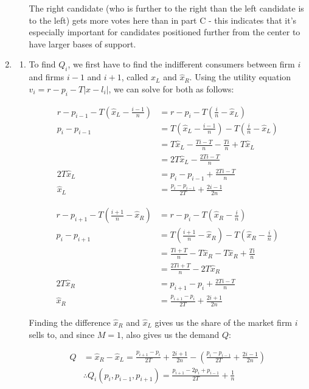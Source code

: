 \documentclass[12pt,letterpaper]{article}
\begin{document}
\begin{enumerate}
\begin{enumerate}
	The right candidate (who is further to the right than the left candidate is to the left) gets more votes here than in part C - this indicates that it's especially important for candidates positioned further from the center to have larger bases of support. 
\end{enumerate}

\item 

\begin{enumerate}
	\item To find $Q_i$, we first have to find the indifferent consumers between firm $i$ and firms $i-1$ and $i+1$, called $\hat{x}_L$ and $\hat{x}_R$. Using the utility equation $v_i = r - p_i - T | x - l_i |$, we can solve for both as follows:

\begin{align*}
	r - p_{i-1} - T(\hat{x}_L - \frac{i-1}{n}) &= r - p_i - T(\frac{i}{n} - \hat{x}_L) \\
	p_i - p_{i-1} &= T(\hat{x}_L - \frac{i-1}{n}) - T(\frac{i}{n} - \hat{x}_L) \\ 
	&= T\hat{x}_L - \frac{Ti-T}{n} - \frac{Ti}{n} + T\hat{x}_L \\
	&= 2T\hat{x}_L - \frac{2Ti - T}{n} \\
	2T\hat{x}_L &= p_i - p_{i-1} +  \frac{2Ti - T}{n} \\
	\hat{x}_L &= \frac{p_i - p_{i-1}}{2T} + \frac{2i - 1}{2n}
\end{align*}

\begin{align*}
	r - p_{i+1} - T(\frac{i+1}{n} - \hat{x}_R) &= r - p_i - T(\hat{x}_R - \frac{i}{n}) \\
	p_i - p_{i+1} &= T(\frac{i+1}{n} - \hat{x}_R) - T(\hat{x}_R - \frac{i}{n}) \\ 
	&= \frac{Ti+T}{n} - T\hat{x}_R - T\hat{x}_R + \frac{Ti}{n} \\
	&= \frac{2Ti + T}{n} - 2T\hat{x}_R \\
	2T\hat{x}_R &= p_{i+1} - p_i +  \frac{2Ti - T}{n} \\
	\hat{x}_R &= \frac{p_{i+1} - p_i}{2T} + \frac{2i + 1}{2n}
\end{align*}

Finding the difference $\hat{x}_R$ and $\hat{x}_L$ gives us the share of the market firm $i$ sells to, and since $M=1$, also gives us the demand $Q$:

\begin{align*}
	Q &= \hat{x}_R - \hat{x}_L = \frac{p_{i+1} - p_i}{2T} + \frac{2i + 1}{2n} - (\frac{p_i - p_{i-1}}{2T} + \frac{2i - 1}{2n}) \\
	&\therefore Q_i (p_i, p_{i-1}, p_{i+1} )  = \frac{p_{i+1} - 2p_i + p_{i-1}}{2T} + \frac{1}{n}
\end{align*}


\end{enumerate}
\end{enumerate}
\end{document}
